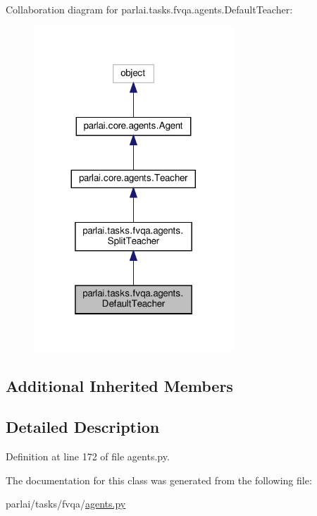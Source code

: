 Collaboration diagram for parlai.\+tasks.\+fvqa.\+agents.\+Default\+Teacher\+:
\nopagebreak
\begin{figure}[H]
\begin{center}
\leavevmode
\includegraphics[width=212pt]{classparlai_1_1tasks_1_1fvqa_1_1agents_1_1DefaultTeacher__coll__graph}
\end{center}
\end{figure}
\subsection*{Additional Inherited Members}


\subsection{Detailed Description}


Definition at line 172 of file agents.\+py.



The documentation for this class was generated from the following file\+:\begin{DoxyCompactItemize}
\item 
parlai/tasks/fvqa/\hyperlink{parlai_2tasks_2fvqa_2agents_8py}{agents.\+py}\end{DoxyCompactItemize}
